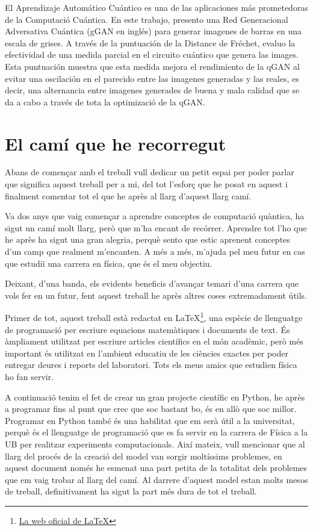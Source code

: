 \documentclass[a4paper,12pt,arial,numbered,print,index,oneside]{book}
\begin{document}
	El Aprendizaje Automático Cuántico es una de las aplicaciones más prometedoras de la Computació Cuántica. En este trabajo, presento una Red Generacional Adversativa Cuántica (gGAN en inglés) para generar imagenes de barras en una escala de grises. A través de la puntuación de la  Distance de Fréchet, evaluo la efectividad de una medida parcial en el circuito cuántico que genera las images. Esta puntuación muestra que esta medida mejora el rendimiento de la qGAN al evitar una oscilación en el parecido entre las imagenes generadas y las reales, es decir, una alternancia entre imagenes generades de buena y mala calidad que se da a cabo a través de tota la optimizació de la qGAN.
	
	\clearpage
	
	\thispagestyle{plain}
	
	\section*{El camí que he recorregut}
	Abans de començar amb el treball vull dedicar un petit espai per poder parlar que significa aquest treball per a mi, del tot l'esforç que he posat en aquest i finalment comentar tot el que he après al llarg d'aquest llarg camí.

	Va dos anys que vaig començar a aprendre conceptes de computació quàntica, ha sigut un camí molt llarg, però que m'ha encant de recórrer. Aprendre tot l'ho que he après ha sigut una gran alegria, perquè sento que estic aprenent conceptes d'un camp que realment m'encanten. A més a més, m'ajuda pel meu futur en cas que estudiï una carrera en física, que és el meu objectiu.

	Deixant, d'una banda, els evidents beneficis d'avançar temari d'una carrera que vols fer en un futur, fent aquest treball he après altres coses extremadament útils.

	Primer de tot, aquest treball està redactat en \LaTeX\footnote{\href{https://www.latex-project.org/}{La web oficial de \LaTeX}}, una espècie de llenguatge de programació per escriure equacions matemàtiques i documents de text. És àmpliament utilitzat per escriure articles científics en el món acadèmic, però més important és utilitzat en l'ambient educatiu de les ciències exactes per poder entregar deures i reports del laboratori. Tots els meus amics que estudien física ho fan servir.

	A continuació tenim el fet de crear un gran projecte científic en Python, he après a programar fins al punt que crec que soc bastant bo, és en allò que soc millor. Programar en Python també és una habilitat que em serà útil a la universitat, perquè és el llenguatge de programació que es fa servir en la carrera de Física a la UB per realitzar experiments computacionals. Així mateix, vull mencionar que al llarg del procés de la creació del model van sorgir moltíssims problemes, en aquest document només he esmenat una part petita de la totalitat dels problemes que em vaig trobar al llarg del camí. Al darrere d'aquest model estan molts mesos de treball, definitivament ha sigut la part més dura de tot el treball.
\end{document}

